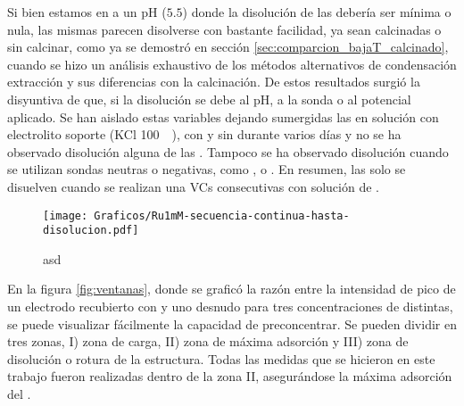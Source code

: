 		Si bien estamos en a un pH ($5.5$) donde la disolución de las \pdm\space debería ser mínima o nula, las mismas parecen disolverse con bastante facilidad, ya sean \pdm\space calcinadas o sin calcinar, como ya se demostró en sección \ref{sec:comparcion_bajaT_calcinado}, cuando se hizo un análisis exhaustivo de los métodos alternativos de condensación extracción y sus diferencias con la calcinación. De estos resultados surgió la disyuntiva de que, si la disolución se debe al pH, a la sonda o al potencial aplicado. Se han aislado estas variables dejando sumergidas las \pdm en solución con electrolito soporte (KCl \SI{100}{\milli\Molar}), con y sin \ru\space durante varios días y no se ha observado disolución alguna de las \pdm. Tampoco se ha observado disolución cuando se utilizan sondas neutras o negativas, como \fe, \hq o \fc. En resumen, las \pdm\space solo se disuelven cuando se realizan una VCs consecutivas con solución de \ru\space.
			
			\begin{figure}[ht]
				\centering
		 	    \texttt{[image: Graficos/Ru1mM-secuencia-continua-hasta-disolucion.pdf]}
		        \caption[asd]{asd}
		        \label{fig:diso_ru1mM}
		      	\end{figure} 

		 En la figura \ref{fig:ventanas}, donde se graficó la razón entre la intensidad de pico de un electrodo recubierto con \pdmF\space y uno desnudo para tres concentraciones de \ru\space distintas, se puede visualizar fácilmente la capacidad de preconcentrar. Se pueden dividir en tres zonas, I) zona de carga, II) zona de máxima adsorción y III) zona de disolución o rotura de la estructura. Todas las medidas que se hicieron en este trabajo fueron realizadas dentro de la zona II, asegurándose la máxima adsorción del \ru\space.

